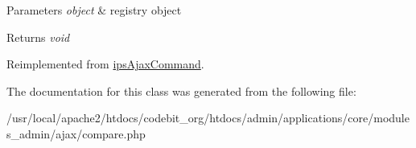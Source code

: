 \begin{DoxyParams}{Parameters}
{\em object} & registry object \\
\hline
\end{DoxyParams}
\begin{DoxyReturn}{Returns}
{\itshape void} 
\end{DoxyReturn}


Reimplemented from \hyperlink{classips_ajax_command_afbc4e912a0604b94d47d66744c64d8ba}{ips\-Ajax\-Command}.



The documentation for this class was generated from the following file\-:\begin{DoxyCompactItemize}
\item 
/usr/local/apache2/htdocs/codebit\-\_\-org/htdocs/admin/applications/core/modules\-\_\-admin/ajax/compare.\-php\end{DoxyCompactItemize}

